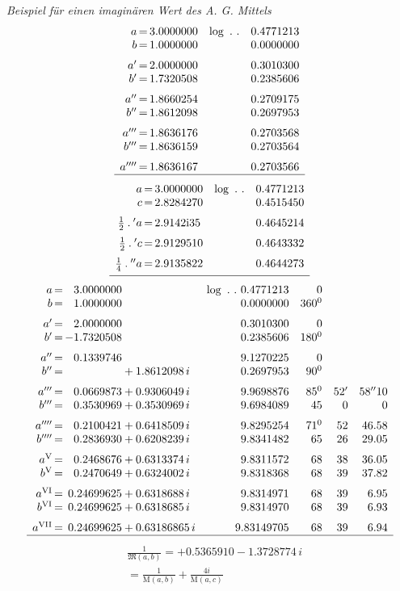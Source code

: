 \par \textit{Beispiel für einen imaginären Wert des A. G. Mittels}
\[
\begin{array}[t]{r@{\,=\,}r l r}
a&3.0000000&\log\ .\ .&0.4771213\\
b&1.0000000&&0.0000000\\[6pt]
a'&2.0000000&&0.3010300\\
b'&1.7320508&&0.2385606\\[6pt]
a''&1.8660254&&0.2709175\\
b''&1.8612098&&0.2697953\\[6pt]
a'''&1.8636176&&0.2703568\\
b'''&1.8636159&&0.2703564\\[6pt]
a''''&1.8636167&&0.2703566\\\hline
\end{array}
\]
\[
\begin{array}[t]{r@{\,=\,}l l r}
a&3.0000000&\log\ .\ .&0.4771213\\
c&2.8284270&&0.4515450\\[6pt]
\frac12\mathbin{.}{}'a&2.9142\mathrm{i}35&&0.4645214\\[6pt]
\frac12\mathbin{.}{}'c&2.9129510&&0.4643332\\[6pt]
\frac14\mathbin{.}{}''a&2.9135822&&0.4644273\\[4pt]\hline
\end{array}
\]
\begingroup\small\setlength{\arraycolsep}{2pt}
\[
\begin{array}{r@{\,=\,}r@{}l r r r r}
a&3.0000000&&\log\ .\ .\ 0.4771213&0&&\\
b&1.0000000&&0.0000000&360^{0}&&\\[6pt]
a'&2.0000000&&0.3010300&0&&\\
b'&-1.7320508&&0.2385606&180^{0}&&\\[6pt]
a''&0.1339746&&9.1270225&0&&\\
b''&&{}+1.8612098\,i&0.2697953&90^{0}&&\\[6pt]
a'''&0.0669873&{}+0.9306049\,i&9.9698876&85^{0}&52'&58''10\\
b'''&0.3530969&{}+0.3530969\,i&9.6984089&45&0&0\\[6pt]
a''''&0.2100421&{}+0.6418509\,i&9.8295254&71^{0}&52&46.58\\
b''''&0.2836930&{}+0.6208239\,i&9.8341482&65&26&29.05\\[6pt]
a^{\mathrm{V}}&0.2468676&{}+0.6313374\,i&9.8311572&68&38&36.05\\
b^{\mathrm{V}}&0.2470649&{}+0.6324002\,i&9.8318368&68&39&37.82\\[6pt]
a^{\mathrm{VI}}&0.24699625&{}+0.6318688\,i&9.8314971&68&39&6.95\\
b^{\mathrm{VI}}&0.24699625&{}+0.6318685\,i&9.8314970&68&39&6.93\\[6pt]
a^{\mathrm{VII}}&0.24699625&{}+0.63186865\,i&9.83149705&68&39&6.94\\\hline
\end{array}
\]
\endgroup
{}
\[
\begin{aligned}&\frac{1}{\mathfrak{M}(a,b)}=+0.5365910-1.3728774\,i\\&=\frac{1}{\mathrm{M}(a,b)}+\frac{4i}{\mathrm{M}(a,c)}\end{aligned}
\]
\clearpage
\endgroup
